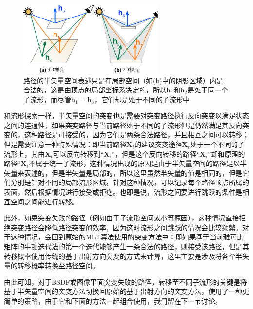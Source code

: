 \begin{figure}
	\sidecaption
	\includegraphics[width=0.65\textwidth]{figures/mlt/submanifolds}
	\caption{路径的半矢量空间表述只是在局部空间（如(b)中的阴影区域）内是合法的，这是由顶点的局部坐标系决定的，所以$\mathbf{h}_1$和$\mathbf{h}_2$是处于同一个子流形，而尽管$\mathbf{h}_1=\mathbf{h}_3$，它们却是处于不同的子流形中}
	\label{f:mlt-submanifolds}
\end{figure}

和流形探索一样，半矢量空间的突变也是需要对突变路径执行反向突变以满足状态之间的连通性，如果突变路径与当前路径处于不同的子流形但是仍然满足其反向突变的，这种路径是可接受的，因为它们是两条合法路径，并且相互之间可以转移；但是需要注意一种特殊情况：即当前路径$\mathbf{X}_i$的建议突变途径$\mathbf{X}_t$处于一个不同的子流形上，其由$\mathbf{X}_t$可以反向转移到“$\mathbf{X}_i$”，但是这个反向转移的路径“$\mathbf{X}_i$”却和原理的路径“$\mathbf{X}_i$不属于统一子流形，这种情况出现的原因是由于半矢量空间的路径是以半矢量来表述的，但是半矢量是局部的，所以这里虽然半矢量的值是相同的，但是它们分别是针对不同的局部流形区域。针对这种情况，可以记录每个路径顶点所属的表面，然后根据情况进行接受或拒绝。也即是说，流形之间要进行跳跃的条件是相互空间之间能进行转移。

此外，如果突变失败的路径（例如由于子流形空间太小等原因），这种情况直接拒绝突变路径会降低路径突变的效率，因为这时流形之间跳跃的情况会比较频繁。对于这种情况，\cite{a:TheNaturalConstraintRepresentationofthePathSpaceforEfficientLightTransportSimulation}会回到原始的MLT算法\cite{a:MetropolisLightTransport}使用的突变方法中：即如果基于当前雅可比矩阵的牛顿迭代法的第一个迭代能够产生一条合法的路径，则接受该路径，但是其转移概率使用传统的基于出射方向突变的方式来计算，这里主要是涉及将各个半矢量的转移概率转换至路径空间。

由此可知，对于BSDF或图像平面突变失败的路径，转移至不同子流形的关键是将基于半矢量空间的突变方法切换回原始的基于出射方向的突变方法，\cite{a:ImprovedHalfVectorSpaceLightTransport}使用了一种更简单的策略，由于它和下面的方法一起组合使用，我们留在下一节讨论。




